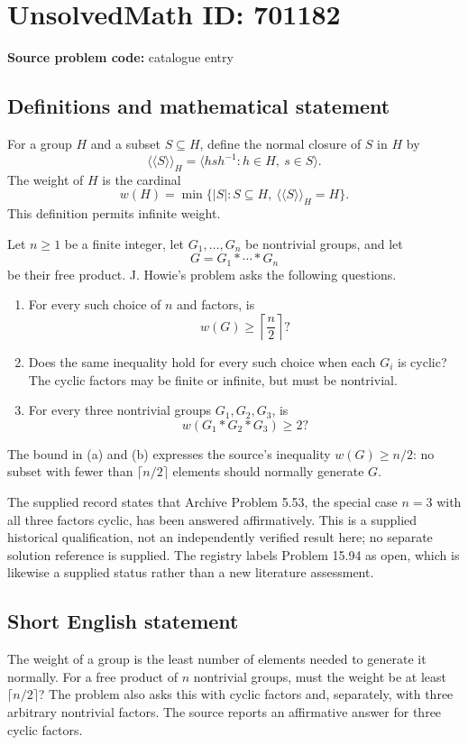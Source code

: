 \documentclass[11pt]{article}
\begin{document}
\section*{UnsolvedMath ID: 701182}
\textbf{Source problem code:} catalogue entry
\subsection{Definitions and mathematical statement}
For a group \(H\) and a subset \(S\subseteq H\), define the normal closure of \(S\) in \(H\) by
\[
\langle\!\langle S\rangle\!\rangle_H
=\bigl\langle hsh^{-1}:h\in H,\ s\in S\bigr\rangle.
\]
The weight of \(H\) is the cardinal
\[
w(H)=\min\bigl\{|S|:S\subseteq H,\ \langle\!\langle S\rangle\!\rangle_H=H\bigr\}.
\]
This definition permits infinite weight.

Let \(n\geq 1\) be a finite integer, let \(G_1,\ldots,G_n\) be nontrivial groups, and let
\[
G=G_1*\cdots*G_n
\]
be their free product. J. Howie's problem asks the following questions.
\begin{enumerate}
\item[(a)] For every such choice of \(n\) and factors, is
\[
w(G)\geq \left\lceil\frac n2\right\rceil?
\]
\item[(b)] Does the same inequality hold for every such choice when each \(G_i\) is cyclic? The cyclic factors may be finite or infinite, but must be nontrivial.
\item[(c)] For every three nontrivial groups \(G_1,G_2,G_3\), is
\[
w(G_1*G_2*G_3)\geq 2?
\]
\end{enumerate}
The bound in (a) and (b) expresses the source's inequality \(w(G)\geq n/2\): no subset with fewer than \(\lceil n/2\rceil\) elements should normally generate \(G\).

The supplied record states that Archive Problem 5.53, the special case \(n=3\) with all three factors cyclic, has been answered affirmatively. This is a supplied historical qualification, not an independently verified result here; no separate solution reference is supplied. The registry labels Problem 15.94 as open, which is likewise a supplied status rather than a new literature assessment.
\subsection{Short English statement}
The weight of a group is the least number of elements needed to generate it normally. For a free product of \(n\) nontrivial groups, must the weight be at least \(\lceil n/2\rceil\)? The problem also asks this with cyclic factors and, separately, with three arbitrary nontrivial factors. The source reports an affirmative answer for three cyclic factors.
\end{document}
